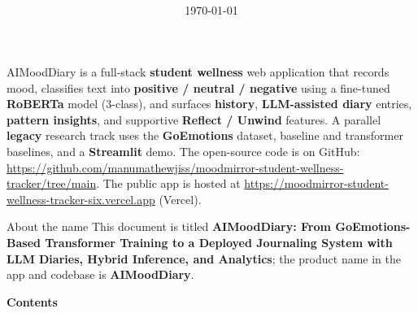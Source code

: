 \documentclass[11pt,a4paper]{article}
\title{%
  \begingroup
  \sffamily\bfseries\color{MMnavy}
  \fontsize{14.2pt}{17pt}\selectfont
  \TheReportTitle\par
  \endgroup
  \vspace{0.65em}
  {\normalsize\sffamily\mdseries\selectfont\color{MMnavyL!90!black}%
   Technical report, user guide, and research notes\par
  }%
}
\author{%
  \sffamily
  \TheAuthorA\qquad\TheAuthorB\\[0.55em]%
  {\small\TheAffilLong}\\[0.45em]%
  {\small\TheEmailA\qquad\TheEmailB}%
}
\date{\sffamily\color{MMnavyL!75}\today}
\newcommand{\TheReportTitle}{AIMoodDiary: From GoEmotions-Based Transformer Training to a Deployed Journaling System with LLM Diaries, Hybrid Inference, and Analytics}
\begin{document}
\thispagestyle{firststyle}
\maketitle
\thispagestyle{firststyle}

\begin{tcolorbox}[
  enhanced, colback=MMsurface, colframe=MMnavy!30,
  boxrule=0.85pt, arc=2pt, left=5mm, right=5mm, top=3.5mm, bottom=3.5mm,
  title={\sffamily\bfseries\color{MMnavy}Abstract}, coltitle=MMnavy, colbacktitle=MMnavy!7,
  attach boxed title to top left={xshift=3mm, yshift*=-0.2mm--0.2mm},
  titlerule=0pt, fonttitle=\sffamily\bfseries
]
\small\color{black!88}
AIMoodDiary is a full-stack \textbf{student wellness} web application that records mood, classifies text into \textbf{positive / neutral / negative} using a fine-tuned \textbf{RoBERTa} model (3-class), and surfaces \textbf{history}, \textbf{LLM-assisted diary} entries, \textbf{pattern insights}, and supportive \textbf{Reflect / Unwind} features. A parallel \textbf{legacy} research track uses the \textbf{GoEmotions} dataset, baseline and transformer baselines, and a \textbf{Streamlit} demo. The open-source code is on GitHub: \url{https://github.com/manumathewjiss/moodmirror-student-wellness-tracker/tree/main}. The public app is hosted at \url{https://moodmirror-student-wellness-tracker-six.vercel.app} (Vercel).
\end{tcolorbox}
\vspace{0.3em}
\begin{CalloutNote}{About the name}
This document is titled \textbf{\TheReportTitle}; the product name in the app and codebase is \textbf{AIMoodDiary}.
\end{CalloutNote}
\vspace{0.2em}

\begin{tcolorbox}[colback=white,colframe=MMnavy!20,boxrule=0.6pt,arc=1.2pt,left=0mm,right=0mm,top=1mm,bottom=0mm]
{\sffamily\bfseries\color{MMnavy}\large Contents}
\vspace{0.2em}
\tableofcontents
\end{tcolorbox}
\clearpage
\thispagestyle{fancy}
\end{document}
